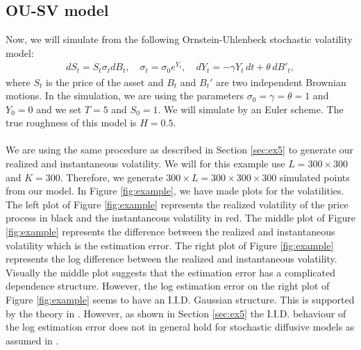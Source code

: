 \documentclass{article}
\begin{document}
\subsection{OU-SV model}
Now, we will simulate from the following Ornstein-Uhlenbeck stochastic volatility model:
\begin{align}
dS_t = S_t \sigma_t dB_t, \quad \sigma_t = \sigma_0 e^{Y_t}, \quad dY_t = -\gamma Y_t \, dt + \theta \, dB'_t, \label{eq:ousv}
\end{align}
where $S_t$ is the price of the asset and $B_t$ and $B_t'$ are two independent Brownian motions. In the simulation, we are using the parameters $\sigma_0=\gamma=\theta=1$ and $Y_0=0$ and we set $T=5$ and $S_0=1$. We will simulate by an Euler scheme. The true roughness of this model is $H=0.5$.\\\\
We are using the same procedure as described in Section \ref{sec:ex5} to generate our realized and instantaneous volatility. We will for this example use $L=300\times 300$ and $K=300$. Therefore, we generate $300\times L=300\times 300 \times 300$ simulated points from our model. In Figure \ref{fig:example}, we have made plots for the volatilities. The left plot of Figure \ref{fig:example} represents the realized volatility of the price process in black and the instantaneous volatility in red. The middle plot of Figure \ref{fig:example} represents the difference between the realized and instantaneous volatility which is the estimation error. The right plot of Figure \ref{fig:example} represents the log difference between the realized and instantaneous volatility. Visually the middle plot suggests that the estimation error has a complicated dependence structure. However, the log estimation error on the right plot of Figure \ref{fig:example} seems to have an I.I.D. Gaussian structure. This is supported by the theory in \cite{fukasawa}. However, as shown in Section \ref{sec:ex5} the I.I.D. behaviour of the log estimation error does not in general hold for stochastic diffusive models as assumed in \cite{fukasawa}. 
\end{document}

